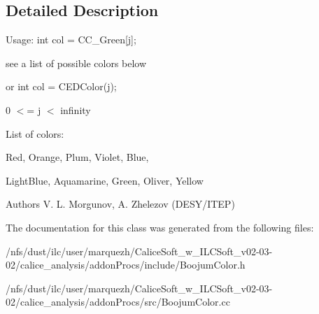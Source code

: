 \subsection{Detailed Description}
\par
 Usage\-: int col = C\-C\-\_\-\-Green[j]; \par
 see a list of possible colors below \par
 \par
 or int col = C\-E\-D\-Color(j); \par
 \par
 0 $<$= j $<$ infinity \par
 \par
 List of colors\-: \par
 \par
 Red, Orange, Plum, Violet, Blue, \par
 Light\-Blue, Aquamarine, Green, Oliver, Yellow \par
 \par
 \par
 \begin{DoxyAuthor}{Authors}
V. L. Morgunov, A. Zhelezov (D\-E\-S\-Y/\-I\-T\-E\-P) \par
 
\end{DoxyAuthor}


The documentation for this class was generated from the following files\-:\begin{DoxyCompactItemize}
\item 
/nfs/dust/ilc/user/marquezh/\-Calice\-Soft\-\_\-w\-\_\-\-I\-L\-C\-Soft\-\_\-v02-\/03-\/02/calice\-\_\-analysis/addon\-Procs/include/Boojum\-Color.\-h\item 
/nfs/dust/ilc/user/marquezh/\-Calice\-Soft\-\_\-w\-\_\-\-I\-L\-C\-Soft\-\_\-v02-\/03-\/02/calice\-\_\-analysis/addon\-Procs/src/Boojum\-Color.\-cc\end{DoxyCompactItemize}
